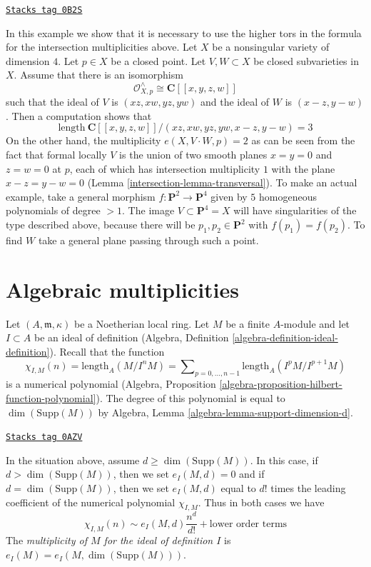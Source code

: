 \begin{example}
\label{intersection-example-naive-multiplicity-wrong}
\href{https://stacks.math.columbia.edu/tag/0B2S}{\texttt{Stacks tag 0B2S}}

In this example we show that it is necessary to use the higher
tors in the formula for the intersection multiplicities above.
Let $X$ be a nonsingular variety of dimension $4$.
Let $p \in X$ be a closed point. Let $V, W \subset X$
be closed subvarieties in $X$. Assume that there is an
isomorphism
$$
\mathcal{O}_{X, p}^\wedge \cong \mathbf{C}[[x, y, z, w]]
$$
such that the ideal of $V$ is $(xz, xw, yz, yw)$ and the ideal
of $W$ is $(x - z, y - w)$. Then a computation shows that
$$
\text{length}\ \mathbf{C}[[x, y, z, w]]/
(xz, xw, yz, yw, x - z, y - w) = 3
$$
On the other hand, the multiplicity $e(X, V \cdot W, p) = 2$
as can be seen from the fact that formal locally $V$ is the
union of two smooth planes $x = y = 0$ and $z = w = 0$ at $p$,
each of which has intersection multiplicity $1$ with the plane
$x - z = y - w = 0$ (Lemma \ref{intersection-lemma-transversal}). To make an
actual example, take
a general morphism $f : \mathbf{P}^2 \to \mathbf{P}^4$ given by
$5$ homogeneous polynomials of degree $> 1$. The image
$V \subset \mathbf{P}^4 = X$ will have singularities of the type
described above, because there will be $p_1, p_2 \in \mathbf{P}^2$
with $f(p_1) = f(p_2)$. To find $W$ take a general plane passing
through such a point.
\end{example}

\section{Algebraic multiplicities}
\label{intersection-section-multiplicities}
Let $(A, \mathfrak m, \kappa)$ be a Noetherian local ring.
Let $M$ be a finite $A$-module and let $I \subset A$ be an ideal
of definition (Algebra, Definition \ref{algebra-definition-ideal-definition}).
Recall that the function
$$
\chi_{I, M}(n) = \text{length}_A(M/I^nM) =
\sum\nolimits_{p = 0, \ldots, n - 1} \text{length}_A(I^pM/I^{p + 1}M)
$$
is a numerical polynomial
(Algebra, Proposition \ref{algebra-proposition-hilbert-function-polynomial}).
The degree of this polynomial is equal to $\dim(\text{Supp}(M))$ by
Algebra, Lemma \ref{algebra-lemma-support-dimension-d}.

\begin{definition}[Multiplicity]
\label{intersection-definition-multiplicity}
\href{https://stacks.math.columbia.edu/tag/0AZV}{\texttt{Stacks tag 0AZV}}

In the situation above, assume $d \geq \dim(\text{Supp}(M))$.
In this case, if  $d > \dim(\text{Supp}(M))$, then we set $e_I(M, d) = 0$
and if $d = \dim(\text{Supp}(M))$, then we set $e_I(M, d)$ equal to $d!$
times the leading coefficient of the numerical polynomial $\chi_{I, M}$.
Thus in both cases we have
$$
\chi_{I, M}(n) \sim e_I(M, d) \frac{n^d}{d!} + \text{lower order terms}
$$
The {\it multiplicity of $M$ for the ideal of definition $I$}
is $e_I(M) = e_I(M, \dim(\text{Supp}(M)))$.
\end{definition}

